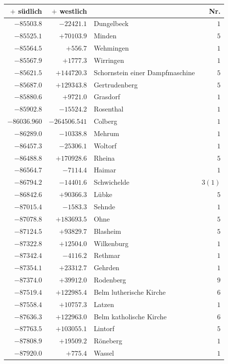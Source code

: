 \begin{center}\begingroup\fontsize{8}{9}\selectfont
\setlength{\tabcolsep}{4pt}
\begin{tabular}{r|r|p{170pt}|r}\hline
\(+\) südlich&\(+\) westlich&&Nr.\\\hline
\(-85503.8\)&\(-22421.1\)&Dungelbeck&\(1\)\\
\(-85525.1\)&\(+70103.9\)&Minden&\(5\)\\
\(-85564.5\)&\(+556.7\)&Wehmingen&\(1\)\\
\(-85567.9\)&\(+1777.3\)&Wirringen&\(1\)\\
\(-85621.5\)&\(+144720.3\)&Schornstein einer Dampfmaschine&\(5\)\\
\(-85687.0\)&\(+129343.8\)&Gertrudenberg&\(5\)\\
\(-85880.6\)&\(+9721.0\)&Grasdorf&\(1\)\\
\(-85902.8\)&\(-15524.2\)&Rosenthal&\(1\)\\
\(-86036.960\)&\(-264506.541\)&Colberg&\(1\)\\
\(-86289.0\)&\(-10338.8\)&Mehrum&\(1\)\\
\(-86457.3\)&\(-25306.1\)&Woltorf&\(1\)\\
\(-86488.8\)&\(+170928.6\)&Rheina&\(5\)\\
\(-86564.7\)&\(-7114.4\)&Haimar&\(1\)\\
\(-86794.2\)&\(-14401.6\)&Schwichelde&\(3 (1)\)\\
\(-86842.6\)&\(+90366.3\)&Lübke&\(5\)\\
\(-87015.4\)&\(-1583.3\)&Sehnde&\(1\)\\
\(-87078.8\)&\(+183693.5\)&Ohne&\(5\)\\
\(-87124.5\)&\(+93829.7\)&Blasheim&\(5\)\\
\(-87322.8\)&\(+12504.0\)&Wilkenburg&\(1\)\\
\(-87342.4\)&\(-4116.2\)&Rethmar&\(1\)\\
\(-87354.1\)&\(+23312.7\)&Gehrden&\(1\)\\
\(-87374.0\)&\(+39912.0\)&Rodenberg&\(9\)\\
\(-87519.4\)&\(+122985.4\)&Belm lutherische Kirche&\(6\)\\
\(-87558.4\)&\(+10757.3\)&Latzen&\(1\)\\
\(-87636.3\)&\(+122963.0\)&Belm katholische Kirche&\(6\)\\
\(-87763.5\)&\(+103055.1\)&Lintorf&\(5\)\\
\(-87808.9\)&\(+19509.2\)&Röneberg&\(1\)\\
\(-87920.0\)&\(+775.4\)&Wassel&\(1\)\\

\end{tabular}
\end{center}
